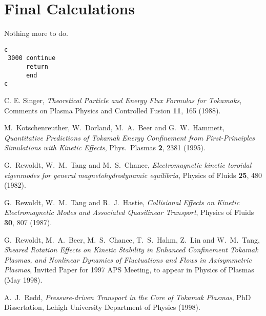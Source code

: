 \section{Final Calculations}

Nothing more to do.

\begin{verbatim}
c
 3000 continue
      return
      end
c
\end{verbatim}



\begin{thebibliography}{99}

 C. E. Singer,
{\it Theoretical Particle and Energy Flux Formulas for Tokamaks},
Comments on Plasma Physics and Controlled Fusion {\bf 11}, 165 (1988).

 M.~Kotschenreuther, W.~Dorland, M.~A.~Beer and
G.~W.~Hammett,
{\it Quantitative Predictions of Tokamak Energy Confinement from
First-Principles Simulations with Kinetic Effects},
Phys.~Plasmas {\bf 2}, 2381 (1995).

 G.~Rewoldt, W.~M.~Tang and M.~S.~Chance,
{\it Electromagnetic kinetic toroidal eigenmodes for general
magnetohydrodynamic equilibria},
Physics of Fluids {\bf 25}, 480 (1982).

 G.~Rewoldt, W.~M.~Tang and R.~J.~Hastie,
{\it Collisional Effects on Kinetic Electromagnetic Modes and Associated
Quasilinear Transport},
Physics of Fluids {\bf 30}, 807 (1987).

 G.~Rewoldt, M.~A.~Beer, M.~S.~Chance, T.~S.~Hahm,
Z.~Lin and W.~M.~Tang,
{\it Sheared Rotation Effects on Kinetic Stability in Enhanced Confinement
Tokamak Plasmas, and Nonlinear Dynamics of Fluctuations and Flows in
Axisymmetric Plasmas},
Invited Paper for 1997 APS Meeting, to appear in Physics of Plasmas (May 1998).

 A.~J.~Redd,
{\it Pressure-driven Transport in the Core of Tokamak Plasmas},
PhD Dissertation, Lehigh University Department of Physics (1998).

\end{thebibliography}


